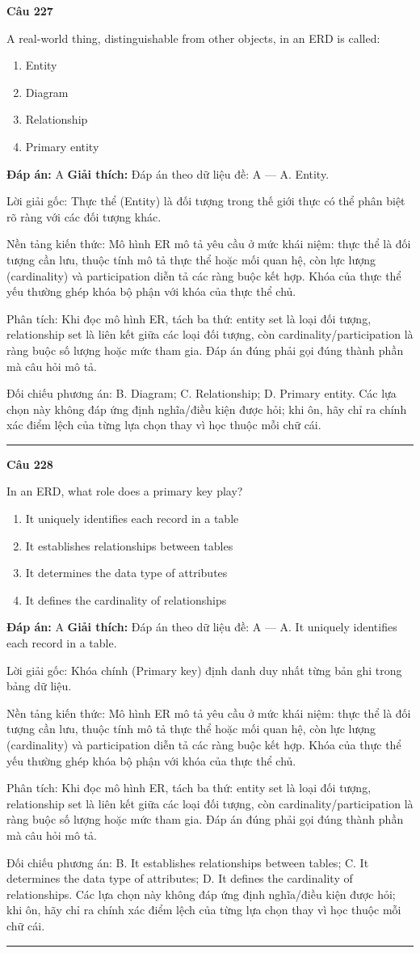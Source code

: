 \documentclass[11pt,a4paper]{article}
\newenvironment{question}[1]{%
  \par\vspace{1em}\noindent\textbf{\large Câu #1}\par\vspace{0.4em}
}{%
  \par\vspace{1em}\hrule\vspace{0.6em}
}
\newenvironment{choices}{%
  \begin{enumerate}[label=\textbf{\Alph*.},leftmargin=2.2em,itemsep=2pt,topsep=3pt]
}{%
  \end{enumerate}
}
\newcommand{\choice}{\item}
\begin{document}
\begin{question}{227}
A real-world thing, distinguishable from other objects, in an ERD is called:
\begin{choices}
\choice Entity
\choice Diagram
\choice Relationship
\choice Primary entity
\end{choices}
\textbf{Đáp án:} A
\textbf{Giải thích:} Đáp án theo dữ liệu đề: A — A. Entity.

Lời giải gốc: Thực thể (Entity) là đối tượng trong thế giới thực có thể phân biệt rõ ràng với các đối tượng khác.

Nền tảng kiến thức: Mô hình ER mô tả yêu cầu ở mức khái niệm: thực thể là đối tượng cần lưu, thuộc tính mô tả thực thể hoặc mối quan hệ, còn lực lượng (cardinality) và participation diễn tả các ràng buộc kết hợp. Khóa của thực thể yếu thường ghép khóa bộ phận với khóa của thực thể chủ.

Phân tích: Khi đọc mô hình ER, tách ba thứ: entity set là loại đối tượng, relationship set là liên kết giữa các loại đối tượng, còn cardinality/participation là ràng buộc số lượng hoặc mức tham gia. Đáp án đúng phải gọi đúng thành phần mà câu hỏi mô tả.

Đối chiếu phương án: B. Diagram; C. Relationship; D. Primary entity. Các lựa chọn này không đáp ứng định nghĩa/điều kiện được hỏi; khi ôn, hãy chỉ ra chính xác điểm lệch của từng lựa chọn thay vì học thuộc mỗi chữ cái.
\end{question}

\begin{question}{228}
In an ERD, what role does a primary key play?
\begin{choices}
\choice It uniquely identifies each record in a table
\choice It establishes relationships between tables
\choice It determines the data type of attributes
\choice It defines the cardinality of relationships
\end{choices}
\textbf{Đáp án:} A
\textbf{Giải thích:} Đáp án theo dữ liệu đề: A — A. It uniquely identifies each record in a table.

Lời giải gốc: Khóa chính (Primary key) định danh duy nhất từng bản ghi trong bảng dữ liệu.

Nền tảng kiến thức: Mô hình ER mô tả yêu cầu ở mức khái niệm: thực thể là đối tượng cần lưu, thuộc tính mô tả thực thể hoặc mối quan hệ, còn lực lượng (cardinality) và participation diễn tả các ràng buộc kết hợp. Khóa của thực thể yếu thường ghép khóa bộ phận với khóa của thực thể chủ.

Phân tích: Khi đọc mô hình ER, tách ba thứ: entity set là loại đối tượng, relationship set là liên kết giữa các loại đối tượng, còn cardinality/participation là ràng buộc số lượng hoặc mức tham gia. Đáp án đúng phải gọi đúng thành phần mà câu hỏi mô tả.

Đối chiếu phương án: B. It establishes relationships between tables; C. It determines the data type of attributes; D. It defines the cardinality of relationships. Các lựa chọn này không đáp ứng định nghĩa/điều kiện được hỏi; khi ôn, hãy chỉ ra chính xác điểm lệch của từng lựa chọn thay vì học thuộc mỗi chữ cái.
\end{question}
\end{document}
